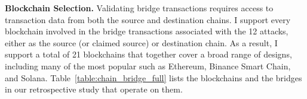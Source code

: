 \textbf{Blockchain Selection.}
%
Validating bridge transactions requires access to
transaction data from both the source and destination chains.  I
support every blockchain involved in the bridge transactions
associated with the 12 attacks, either as the source (or claimed
source) or destination chain.  As a result, I support a total of 21
blockchains that together cover a
broad range of designs, including many of the most popular such as 
Ethereum, Binance Smart Chain, and Solana.
%
Table~\ref{table:chain_bridge_full} lists the blockchains and the
bridges in our retrospective study that operate on them.%











